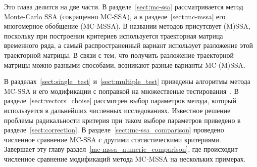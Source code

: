 \documentclass[specialist,
substylefile = spbu_report.rtx,
subf,href,colorlinks=true, 12pt]{disser}
\theoremstyle{definition}
\begin{document}
Это глава делится на две части. В разделе~\ref{sect:mc-ssa} рассматривается метод Monte-Carlo SSA (сокращенно MC-SSA), а в разделе~\ref{sect:mc-mssa} его многомерное обобщение (MC-MSSA). В названии методов присутсвует (M)SSA, поскольку при построении критериев используется траекторная матрица временного ряда, а самый распространенный вариант использует разложение этой траекторной матрицы. В связи с тем, что получить разложение траекторной матрицы можно разными способами, возникают разные варианты MC-(M)SSA.

В разделах~\ref{sect:single_test} и~\ref{sect:multiple_test} приведены алгоритмы метода MC-SSA и его модификации с поправкой на множественые тестирования~\cite{Golyandina_2023}. В разделе~\ref{sect:vectors_choise} рассмотрен выбор параметров метода, который используется в дальнейших численных исследованиях. Известное решение проблемы радикальности критерия при таком выборе параметров приведено в разделе~\ref{sect:correction}. В разделе~\ref{sect:mc-ssa_comparison} проведено численное сравнение MC-SSA с другими статистическими критериями. Завершает эту главу раздел~\ref{mc-mssa_numeric_comparison}, где происходит численное сравнение модификаций метода MC-MSSA на нескольких примерах.
\end{document}
